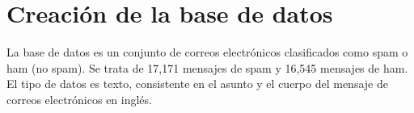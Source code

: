\section{Creación de la base de datos}
La base de datos es un conjunto de correos electrónicos clasificados como spam o ham (no spam). Se trata de 17,171 mensajes de spam y 16,545 mensajes de ham. El tipo de datos es texto, consistente en el asunto y el cuerpo del mensaje de correos electrónicos en inglés.
